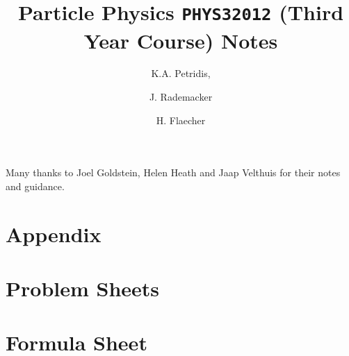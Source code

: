 \documentclass[a4paper,11pt]{article}
\title{\boldmath Particle Physics \texttt{{\bf PHYS32012}} (Third Year Course) Notes}
\author[a]{K.A. Petridis,}
\author[a]{J. Rademacker}
\author[a]{H. Flaecher}
\affiliation[a]{University of Bristol,Bristol, UK}
\begin{document}
 
\linenumbers

\maketitle
\flushbottom
\acknowledgments
Many thanks to Joel Goldstein, Helen Heath and Jaap Velthuis
for their notes and guidance.
\newpage




% 


\newpage


\newpage


\newpage


%
 
\newpage





%










\appendix
\section*{Appendix}








%
\section{Problem Sheets}




\cleardoublepage

\section{Formula Sheet}
\label{sec:formulaSheet}



\cleardoublepage



\end{document}
